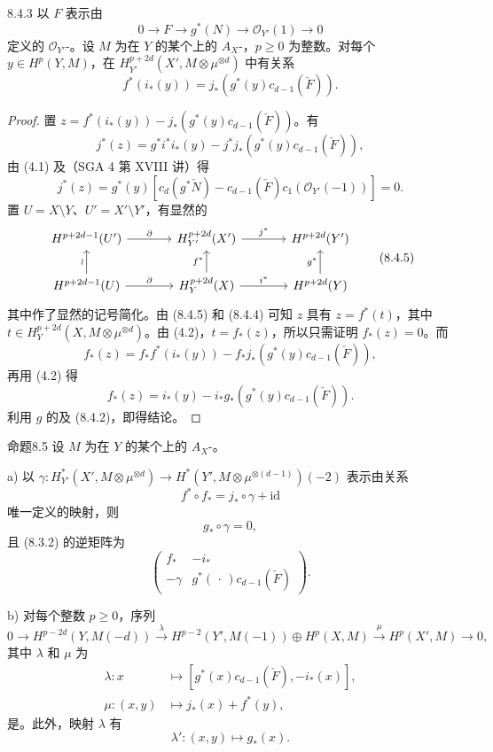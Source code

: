 \begin{SGAresult}{}{8.4.3}
以 $F$ 表示由
\[
0\longrightarrow F\longrightarrow g^*(N)\longrightarrow\mathscr O_{Y'}(1)\longrightarrow0
\]
定义的 $\mathscr O_{Y'}$-。设 $M$ 为在 $Y$ 的某个上的 $A_X$-，$p\ge0$ 为整数。对每个 $y\in H^p(Y,M)$，在 $H_{Y'}^{p+2d}(X',M\otimes\mu^{\otimes d})$ 中有关系
\[
 f^*(i_*(y))=j_*(g^*(y)c_{d-1}(\check F)).
\]
\end{SGAresult}
\begin{proof}
置 $z=f^*(i_*(y))-j_*(g^*(y)c_{d-1}(\check F))$。有
\[
 j^*(z)=g^*i^*i_*(y)-j^*j_*(g^*(y)c_{d-1}(\check F)),
\]
由 (4.1) 及（SGA 4 第 XVIII 讲）得
\[
 j^*(z)=g^*(y)[c_d(g^*\check N)-c_{d-1}(\check F)c_1(\mathscr O_{Y'}(-1))]=0.
 \tag{8.4.4}
\]
置 $U=X\setminus Y$、$U'=X'\setminus Y'$，有显然的
\[
\begin{tikzcd}[column sep=large]
 H^{p+2d-1}(U')\arrow[r,"\partial"]&H_{Y'}^{p+2d}(X')\arrow[r,"j^*"]&H^{p+2d}(Y')\\
 H^{p+2d-1}(U)\arrow[u,"\wr"]\arrow[r,"\partial"]&H_Y^{p+2d}(X)\arrow[u,"f^*"]\arrow[r,"i^*"]&H^{p+2d}(Y)\arrow[u,"g^*"]
\end{tikzcd}\tag{8.4.5}
\]
其中作了显然的记号简化。由 (8.4.5) 和 (8.4.4) 可知 $z$ 具有 $z=f^*(t)$，其中 $t\in H_Y^{p+2d}(X,M\otimes\mu^{\otimes d})$。由 (4.2)，$t=f_*(z)$，所以只需证明 $f_*(z)=0$。而
\[
 f_*(z)=f_*f^*(i_*(y))-f_*j_*(g^*(y)c_{d-1}(\check F)),
\]
再用 (4.2) 得
\[
 f_*(z)=i_*(y)-i_*g_*(g^*(y)c_{d-1}(\check F)).
\]
利用 $g$ 的及 (8.4.2)，即得结论。
\end{proof}
\begin{SGAresult}{命题}{8.5}
设 $M$ 为在 $Y$ 的某个上的 $A_X$-。

a) 以 $\gamma:H_{Y'}^*(X',M\otimes\mu^{\otimes d})\to H^*(Y',M\otimes\mu^{\otimes(d-1)})(-2)$ 表示由关系
\[
 f^*\circ f_*=j_*\circ\gamma+\mathrm{id}\tag{8.5.1}
\]
唯一定义的映射，则
\[
 g_*\circ\gamma=0,\tag{8.5.2}
\]
且 (8.3.2) 的逆矩阵为
\[
 \begin{pmatrix}f_*&-i_*\\-\gamma&g^*(\,\cdot\,)c_{d-1}(\check F)\end{pmatrix}.
 \tag{8.5.3}
\]

b) 对每个整数 $p\ge0$，序列
\[
0\longrightarrow H^{p-2d}(Y,M(-d))\xrightarrow{\lambda}
 H^{p-2}(Y',M(-1))\oplus H^p(X,M)\xrightarrow{\mu}H^p(X',M)\longrightarrow0,
\]
其中 $\lambda$ 和 $\mu$ 为
\[
\begin{aligned}
\lambda:x&\longmapsto[g^*(x)c_{d-1}(\check F),-i_*(x)],\\
\mu:(x,y)&\longmapsto j_*(x)+f^*(y),
\end{aligned}
\]
是。此外，映射 $\lambda$ 有
\[
 \lambda':(x,y)\longmapsto g_*(x).
\]
\end{SGAresult}
